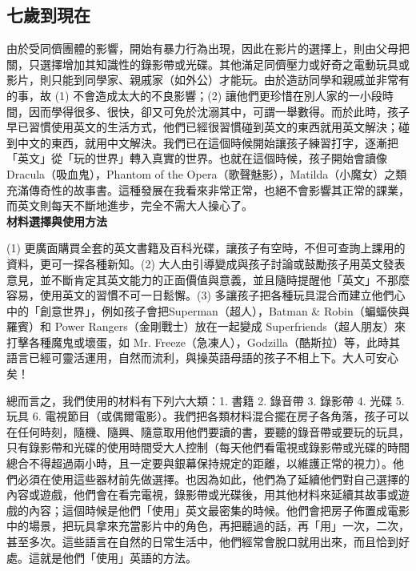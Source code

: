 \subsection{七歲到現在}
由於受同儕團體的影響，開始有暴力行為出現，因此在影片的選擇上，則由父母把關，只選擇增加其知識性的錄影帶或光碟。其他滿足同儕壓力或好奇之電動玩具或影片，則只能到同學家、親戚家（如外公）才能玩。由於造訪同學和親戚並非常有的事，故 (1) 不會造成太大的不良影響；(2) 讓他們更珍惜在別人家的一小段時間，因而學得很多、很快，卻又可免於沈溺其中，可謂一舉數得。而於此時，孩子早已習慣使用英文的生活方式，他們已經很習慣碰到英文的東西就用英文解決；碰到中文的東西，就用中文解決。我們已在這個時候開始讓孩子練習打字，逐漸把「英文」從「玩的世界」轉入真實的世界。也就在這個時候，孩子開始會讀像 Dracula（吸血鬼），Phantom of the Opera（歌聲魅影），Matilda（小魔女）之類充滿傳奇性的故事書。這種發展在我看來非常正常，也絕不會影響其正常的課業，而英文則每天不斷地進步，完全不需大人操心了。\\

\textbf{材料選擇與使用方法}

(1) 更廣面購買全套的英文書籍及百科光碟，讓孩子有空時，不但可查詢上課用的資料，更可一探各種新知。(2) 大人由引導變成與孩子討論或鼓勵孩子用英文發表意見，並不斷肯定其英文能力的正面價值與意義，並且隨時提醒他「英文」不那麼容易，使用英文的習慣不可一日鬆懈。(3) 多讓孩子把各種玩具混合而建立他們心中的「創意世界」，例如孩子會把Superman（超人），Batman \& Robin（蝙蝠俠與羅賓）和 Power Rangers（金剛戰士）放在一起變成 {\E Superfriends}（超人朋友）來打擊各種魔鬼或壞蛋，如 Mr. Freeze（急凍人），Godzilla（酷斯拉）等，此時其語言已經可靈活運用，自然而流利，與操英語母語的孩子不相上下。大人可安心矣！

總而言之，我們使用的材料有下列六大類：1. 書籍 2. 錄音帶 3. 錄影帶 4. 光碟 5. 玩具 6. 電視節目（或偶爾電影）。我們把各類材料混合擺在房子各角落，孩子可以在任何時刻，隨機、隨興、隨意取用他們要讀的書，要聽的錄音帶或要玩的玩具，只有錄影帶和光碟的使用時間受大人控制（每天他們看電視或錄影帶或光碟的時間總合不得超過兩小時，且一定要與銀幕保持規定的距離，以維護正常的視力）。他們必須在使用這些器材前先做選擇。也因為如此，他們為了延續他們對自己選擇的內容或遊戲，他們會在看完電視，錄影帶或光碟後，用其他材料來延續其故事或遊戲的內容；這個時候是他們「使用」英文最密集的時候。他們會把房子佈置成電影中的場景，把玩具拿來充當影片中的角色，再把聽過的話，再「用」一次，二次，甚至多次。這些語言在自然的日常生活中，他們經常會脫口就用出來，而且恰到好處。這就是他們「使用」英語的方法。


